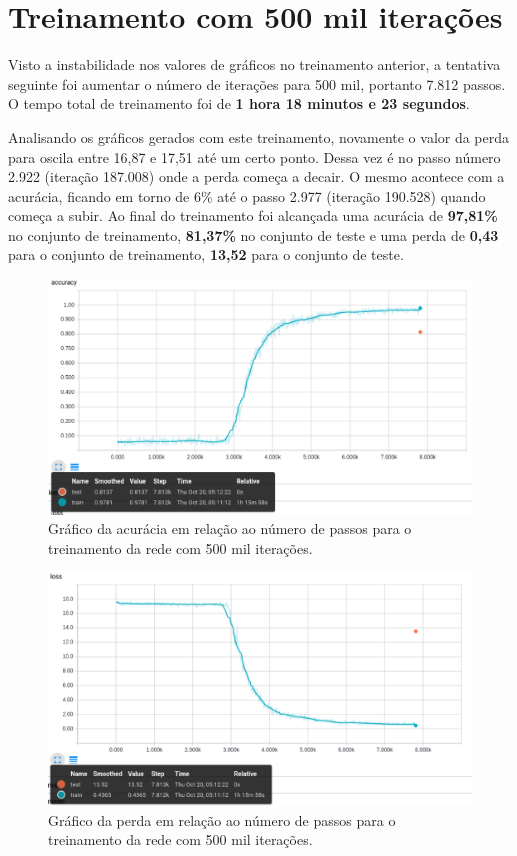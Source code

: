 \section{Treinamento com 500 mil iterações}

Visto a instabilidade nos valores de gráficos no treinamento anterior,
a tentativa seguinte foi aumentar o número de iterações para 500 mil,
portanto 7.812 passos. O tempo total de treinamento foi de {\bf 1 hora
18 minutos e 23 segundos}.

Analisando os gráficos gerados com este treinamento, novamente o valor
da perda para oscila entre 16,87 e 17,51 até um certo ponto. Dessa vez
é no passo número 2.922 (iteração 187.008) onde a perda começa a
decair. O mesmo acontece com a acurácia, ficando em torno de 6\% até o
passo 2.977 (iteração 190.528) quando começa a subir. Ao final do
treinamento foi alcançada uma acurácia de {\bf 97,81\%} no conjunto de
treinamento, {\bf 81,37\%} no conjunto de teste e uma perda de {\bf
  0,43} para o conjunto de treinamento, {\bf 13,52} para o conjunto de
teste.

\begin{figure}[H]
\centering
\includegraphics[scale=0.4]{imagens/accuracy_500k}
\caption{Gráfico da acurácia em relação ao número de passos para o
  treinamento da rede com 500 mil iterações.}
\label{fig:accuracy_500k}
\end{figure}

\begin{figure}[H]
\centering
\includegraphics[scale=0.4]{imagens/loss_500k}
\caption{Gráfico da perda em relação ao número de passos para o
  treinamento da rede com 500 mil iterações.}
\label{fig:loss_500k}
\end{figure}

